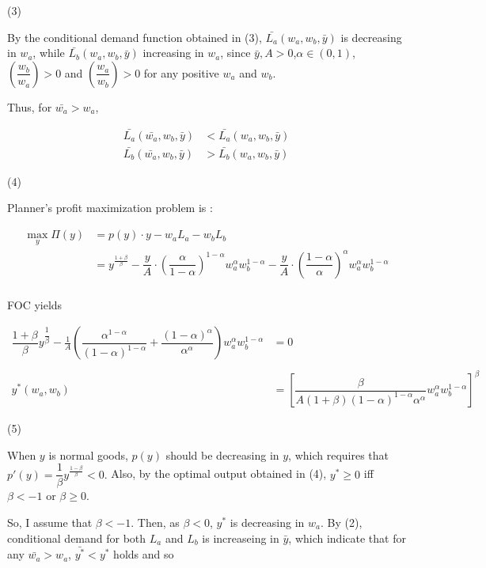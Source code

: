 \documentclass[dvipdfmx]{jsarticle}
\begin{document}
\begin{enumerate}
 (3)
 
 By the conditional demand function obtained in (3), $\bar{L_a}(w_a,w_b,\bar{y})$ is decreasing in $w_a$, while $\bar{L_b}(w_a,w_b,\bar{y})$ increasing in $w_a$, since $\bar{y}, A >0$,$\alpha \in (0,1)$, $\left( \dfrac{w_b}{w_a} \right) > 0$ and $\left( \dfrac{w_a}{w_b} \right)>0$ for any positive $w_a$ and $w_b$.
 
 Thus, for $\bar{w_a} > w_a$,
 
  \begin{align*}
  \bar{L_a}(\bar{w_a}, w_b, \bar{y}) &< \bar{L_a}(w_a, w_b, \bar{y}) \\
  \bar{L_b}(\bar{w_a}, w_b, \bar{y}) & >\bar{L_b}(w_a, w_b, \bar{y})
  \end{align*}
 
 (4)
 
 Planner's profit maximization problem is :
 
  \begin{align*}
  \max_{y} \Pi(y) &= p(y) \cdot y - w_a L_a - w_b L_b \\
  &= y^{\frac{1+\beta}{\beta}} 
  - \dfrac{y}{A} \cdot \left( \dfrac{\alpha}{1-\alpha} \right)^{1-\alpha} w_a^{\alpha} w_b^{1-\alpha}
  - \dfrac{y}{A} \cdot \left( \dfrac{1-\alpha}{\alpha} \right)^{\alpha} w_a^{\alpha} w_b^{1-\alpha} \\ 
  \end{align*} 
 
 FOC yields
 
  \begin{align*}
  \dfrac{1+\beta}{\beta} y^{\dfrac{1}{\beta}} 
  - \frac{1}{A} \left( \dfrac{\alpha^{1-\alpha}}{(1-\alpha)^{1-\alpha}}
  + \dfrac{(1-\alpha)^{\alpha}}{\alpha^\alpha} \right)
  w_a^{\alpha} w_b^{1-\alpha} &=0 \\
  \\
  y^* (w_a, w_b) &= \left[ \dfrac{\beta}{A(1+\beta)(1-\alpha)^{1-\alpha} \alpha^\alpha}
  w_a^{\alpha} w_b^{1-\alpha} \right]^{\beta}
  \end{align*}
 
 (5)
 
 When $y$ is normal goods, $p(y)$ should be decreasing in $y$, which requires that $p'(y) = \dfrac{1}{\beta} y^{\frac{1-\beta}{\beta}} < 0.$ Also, by the optimal output obtained in (4), $y^* \geq 0$ iff $\beta < -1$ or $\beta \geq 0$. 
 
 So, I assume that $\beta < -1$. Then, as $\beta < 0$, $y^*$ is decreasing in $w_a$. By (2), conditional demand for both $L_a$ and $L_b$ is increaseing in $\bar{y}$, which indicate that for any $\bar{w_a} > w_a$, $\bar{y^*} < y^*$ holds and so
 

\end{enumerate}
\end{document}
